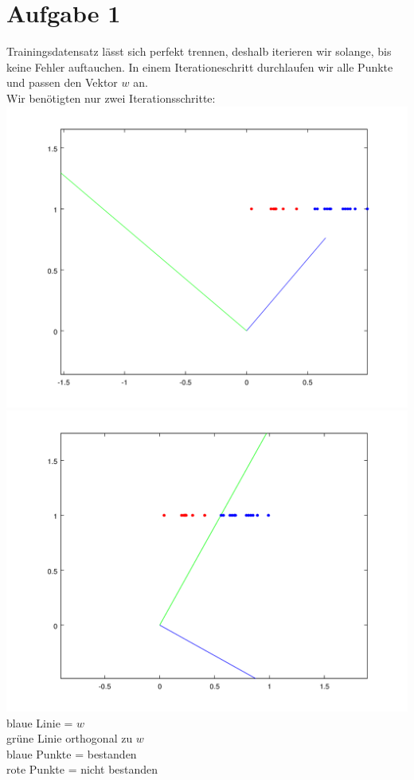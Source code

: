 \documentclass[a4paper,10pt]{article}
\begin{document}
\section{Aufgabe 1}
	Trainingsdatensatz lässt sich perfekt trennen,
	deshalb iterieren wir solange, bis keine Fehler auftauchen.
	In einem Iterationeschritt durchlaufen wir alle Punkte und passen
	den Vektor $w$ an.\\
	Wir benötigten nur zwei Iterationsschritte:\\
	\includegraphics[scale=0.4]{aufg1_iteration1}\\
	\includegraphics[scale=0.4]{aufg1_iteration2}\\
	blaue Linie = $w$\\
	grüne Linie orthogonal zu $w$\\
	blaue Punkte = bestanden\\
	rote Punkte = nicht bestanden\\
			
\end{document}
